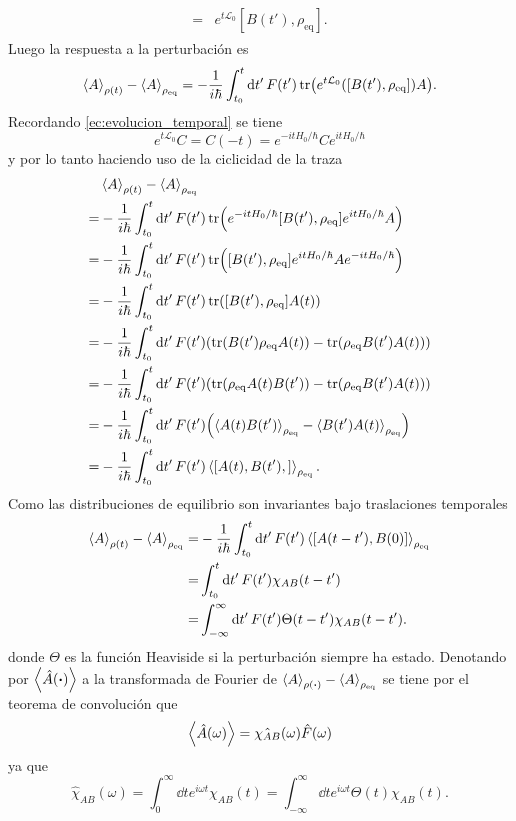 \documentclass{article}
\begin{document}
\begin{enumerate}
\begin{align}
\begin{split}
=&e^{t\mathcal{L}_0}[B(t'),\rho_{\text{eq}}].
\end{split}
\end{align}
Luego la respuesta a la perturbación es 
\begin{equation}
\ev{A}_{\rho(t)}-\ev{A}_{\rho_\text{eq}}=-\frac{1}{i\hbar}\int_{t_0}^t\dd{t'}F(t')\tr(e^{t\mathcal{L}_0}([B(t'),\rho_{\text{eq}}])A).
\end{equation}
Recordando \eqref{ec:evolucion_temporal} se tiene
\begin{equation}
e^{t\mathcal{L}_0}C=C(-t)=e^{-itH_0/\hbar}Ce^{itH_0/\hbar}
\end{equation}
y por lo tanto haciendo uso de la ciclicidad de la traza
\begin{align}
\begin{split}
&\ev{A}_{\rho(t)}-\ev{A}_{\rho_\text{eq}}\\
=&-\frac{1}{i\hbar}\int_{t_0}^t\dd{t'}F(t')\tr(e^{-itH_0/\hbar}[B(t'),\rho_{\text{eq}}]e^{itH_0/\hbar}A)\\
=&-\frac{1}{i\hbar}\int_{t_0}^t\dd{t'}F(t')\tr([B(t'),\rho_{\text{eq}}]e^{itH_0/\hbar}Ae^{-itH_0/\hbar})\\
=&-\frac{1}{i\hbar}\int_{t_0}^t\dd{t'}F(t')\tr([B(t'),\rho_{\text{eq}}]A(t))\\
=&-\frac{1}{i\hbar}\int_{t_0}^t\dd{t'}F(t')\qty(\tr(B(t')\rho_{\text{eq}}A(t))-\tr(\rho_{\text{eq}}B(t')A(t)))\\
=&-\frac{1}{i\hbar}\int_{t_0}^t\dd{t'}F(t')\qty(\tr(\rho_{\text{eq}}A(t)B(t'))-\tr(\rho_{\text{eq}}B(t')A(t)))\\
=&-\frac{1}{i\hbar}\int_{t_0}^t\dd{t'}F(t')\qty(\ev{A(t)B(t')}_{\rho_{\text{eq}}}-\ev{B(t')A(t)}_{\rho_{\text{eq}}})\\
=&-\frac{1}{i\hbar}\int_{t_0}^t\dd{t'}F(t')\ev{[A(t),B(t'),]}_{\rho_{\text{eq}}}.
\end{split}
\end{align}
Como las distribuciones de equilibrio son invariantes bajo traslaciones temporales
\begin{align}\label{ec:valores_esperados}
\begin{split}
\ev{A}_{\rho(t)}-\ev{A}_{\rho_\text{eq}}=&-\frac{1}{i\hbar}\int_{t_0}^t\dd{t'}F(t')\ev{[A(t-t'),B(0)]}_{\rho_{\text{eq}}}\\
=&\int_{t_0}^t\dd{t'}F(t')\chi_{AB}(t-t')\\
=&\int_{-\infty}^\infty\dd{t'}F(t')\Theta(t-t')\chi_{AB}(t-t').
\end{split}
\end{align}
donde $\Theta$ es la función Heaviside si la perturbación siempre ha estado. Denotando por $\ev{\hat{A}(\vdot)}$ a la transformada de Fourier de $\ev{A}_{\rho(\vdot)}-\ev{A}_{\rho_\text{eq}}$ se tiene por el teorema de convolución que
\begin{equation}
\ev{\hat{A}(\omega)}=\hat{\chi_{AB}}(\omega)\hat{F}(\omega)
\end{equation}
ya que
\begin{equation}
\hat{\chi}_{AB}(\omega)=\int_0^\infty\dd{t}e^{i\omega t}\chi_{AB}(t)=\int_{-\infty}^\infty\dd{t}e^{i\omega t}\Theta(t)\chi_{AB}(t).
\end{equation}


\end{enumerate}
\end{document}
